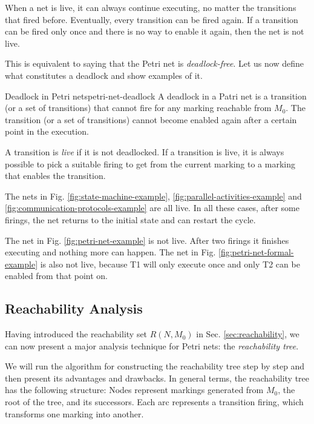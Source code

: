 When a net is live, it can always continue executing,
no matter the transitions that fired before.
Eventually, every transition can be fired again.
If a transition can be fired only once and there is no way to enable it again,
then the net is not live.

This is equivalent to saying that the Petri net is \emph{deadlock-free}.
Let us now define what constitutes a deadlock and show examples of it.

\begin{definition}{Deadlock in Petri nets}{petri-net-deadlock}
      A deadlock in a Patri net is a transition (or a set of transitions) that cannot fire
      for any marking reachable from $M_0$.
      The transition (or a set of transitions) cannot become enabled again
      after a certain point in the execution.
\end{definition}

A transition is \emph{live} if it is not deadlocked.
If a transition is live, it is always possible to pick a suitable firing
to get from the current marking to a marking that enables the transition.

The nets in Fig. \ref{fig:state-machine-example}, \ref{fig:parallel-activities-example}
and \ref{fig:communication-protocols-example} are all live.
In all these cases, after some firings,
the net returns to the initial state and can restart the cycle.

The net in Fig. \ref{fig:petri-net-example} is not live.
After two firings it finishes executing and nothing more can happen.
The net in Fig. \ref{fig:petri-net-formal-example} is also not live, because
T1 will only execute once and only T2 can be enabled from that point on.

\subsection{Reachability Analysis}

Having introduced the reachability set $R(N, M_0)$ in Sec. \ref{sec:reachability},
we can now present a major analysis technique for Petri nets: the \emph{reachability tree}.

We will run the algorithm for constructing the reachability tree step by step
and then present its advantages and drawbacks.
In general terms, the reachability tree has the following structure:
Nodes represent markings generated from $M_0$, the root of the tree, and its successors.
Each arc represents a transition firing, which transforms one marking into another.

